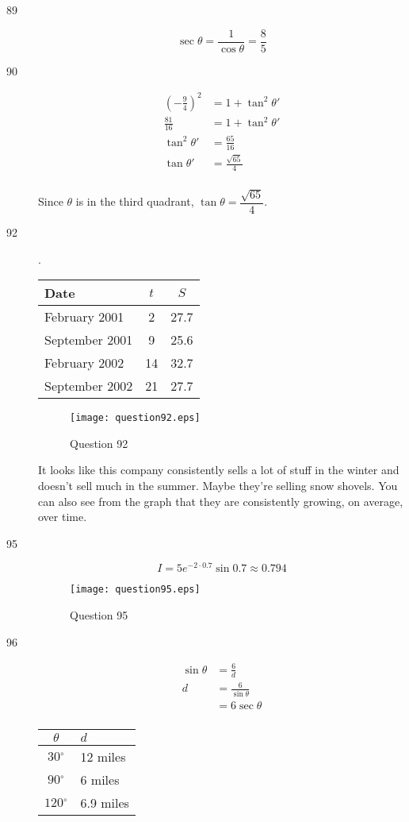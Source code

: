 \documentclass[fleqn,addpoints]{exam}
\newcommand{\degree}{\ensuremath{^\circ}}
\begin{document}
\begin{description}
\item[89]
\[
  \sec \theta = \frac{1}{\cos \theta} = \frac{8}{5}
\]

\item[90]
\begin{align*}
  \left( -\frac{9}{4} \right)^2 &= 1 + \tan^2 \theta' \\
  \frac{81}{16} &= 1 + \tan^2 \theta' \\
  \tan^2 \theta' &= \frac{65}{16} \\
  \tan \theta' &= \frac{\sqrt{65}}{4} \\
\end{align*}

Since $\theta$ is in the third quadrant, $\tan \theta = \dfrac{\sqrt{65}}{4}$.

\item[92]
.

\begin{tabular}{lcc}
\toprule
Date & $t$ & $S$ \\
\midrule
February 2001 & 2 & 27.7 \\
September 2001 & 9 & 25.6 \\
February 2002 & 14 & 32.7 \\
September 2002 & 21 & 27.7 \\
\bottomrule
\end{tabular}

\begin{figure}[H]
  \centering
  \texttt{[image: question92.eps]}
  \caption*{Question 92}
\end{figure}

It looks like this company consistently sells a lot of stuff in the winter and doesn't sell much in the summer.  Maybe
they're selling snow shovels.  You can also see from the graph that they are consistently growing, on average, over time.

\item[95]

\[
  I = 5 e^{-2 \cdot 0.7} \sin 0.7 \approx 0.794
\]

\begin{figure}[H]
  \centering
  \texttt{[image: question95.eps]}
  \caption*{Question 95}
\end{figure}

\item[96]

\begin{align*}
  \sin \theta &= \frac{6}{d} \\
  d &= \frac{6}{\sin \theta} \\
   &= 6 \sec \theta \\
\end{align*}

\begin{tabular}{cl}
\toprule
$\theta$ & $d$ \\
\midrule
$30 \degree$ & 12 miles   \\
$90 \degree$ & 6 miles   \\
$120 \degree$ & 6.9 miles   \\
\bottomrule
\end{tabular}


\end{description}
\end{document}
